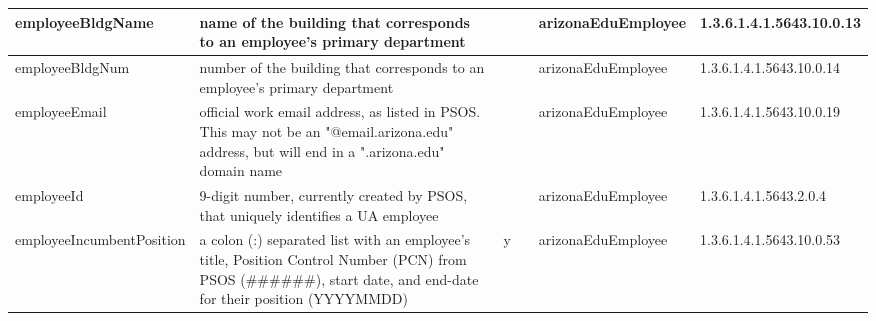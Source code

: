 \documentclass[12pt,notitlepage]{article}
\begin{document}
{\begin{tabular}{|p{3cm}|p{4cm}|p{0.7cm}|p{1cm}|l|l|}
\hline
employeeBldgName & name of the building that corresponds to an employee's primary department & & & arizonaEduEmployee & 1.3.6.1.4.1.5643.10.0.13\\
\hline
employeeBldgNum & number of the building that corresponds to an employee's primary department & & & arizonaEduEmployee & 1.3.6.1.4.1.5643.10.0.14\\
\hline
employeeEmail & official work email address, as listed in PSOS. This may not be an "@email.arizona.edu" address, but will end in a ".arizona.edu" domain name & & & arizonaEduEmployee & 1.3.6.1.4.1.5643.10.0.19\\
\hline
employeeId & 9-digit number, currently created by PSOS, that uniquely identifies a UA employee & & & arizonaEduEmployee & 1.3.6.1.4.1.5643.2.0.4\\
\hline
employeeIncumbentPosition & a colon (:) separated list with an employee's title, Position Control Number (PCN) from PSOS (\#\#\#\#\#\#), start date, and end-date for their position (YYYYMMDD) & y & & arizonaEduEmployee & 1.3.6.1.4.1.5643.10.0.53 \\
\hline
\end{tabular}

}
\end{document}
